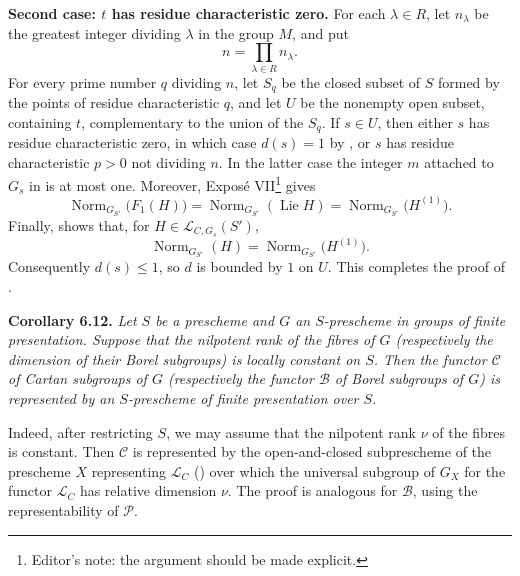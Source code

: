 \textbf{Second case: \(t\) has residue characteristic zero.}
For each \(\lambda\in R\), let \(n_\lambda\) be the greatest integer dividing
\(\lambda\) in the group \(M\), and put
\[
n=\prod_{\lambda\in R}n_\lambda.
\]
For every prime number \(q\) dividing \(n\), let \(S_q\) be the closed subset
of \(S\) formed by the points of residue characteristic \(q\), and let \(U\)
be the nonempty open subset, containing \(t\), complementary to the union of
the \(S_q\). If \(s\in U\), then either \(s\) has residue characteristic zero,
in which case \(d(s)=1\) by , or \(s\) has residue characteristic
\(p>0\) not dividing \(n\). In the latter case the integer \(m\) attached to
\(G_s\) in  is at most one. Moreover, Exposé
VII\footnote{Editor's note: the argument should be made explicit.} gives
\[
\operatorname{Norm}_{G_{S'}}\bigl(F_1(H)\bigr)
 =\operatorname{Norm}_{G_{S'}}(\operatorname{Lie}H)
 =\operatorname{Norm}_{G_{S'}}\bigl(H^{(1)}\bigr).
\]
Finally,  shows that, for
\(H\in\mathcal L_{C,G_s}(S')\),
\[
\operatorname{Norm}_{G_{S'}}(H)
 =\operatorname{Norm}_{G_{S'}}\bigl(H^{(1)}\bigr).
\]
Consequently \(d(s)\leq1\), so \(d\) is bounded by \(1\) on \(U\).
This completes the proof of .

\textbf{Corollary 6.12.} \emph{Let \(S\) be a prescheme and \(G\) an
\(S\)-prescheme in groups of finite presentation. Suppose that the nilpotent
rank of the fibres of \(G\) (respectively the dimension of their Borel
subgroups) is locally constant on \(S\). Then the functor \(\mathcal C\) of
Cartan subgroups of \(G\) (respectively the functor \(\mathcal B\) of Borel
subgroups of \(G\)) is represented by an \(S\)-prescheme of finite
presentation over \(S\).}

Indeed, after restricting \(S\), we may assume that the nilpotent rank
\(\nu\) of the fibres is constant. Then \(\mathcal C\) is represented by the
open-and-closed subprescheme of the prescheme \(X\) representing
\(\mathcal L_C\) () over which the universal subgroup of \(G_X\) for the
functor \(\mathcal L_C\) has relative dimension \(\nu\). The proof is
analogous for \(\mathcal B\), using the representability of \(\mathcal P\).



